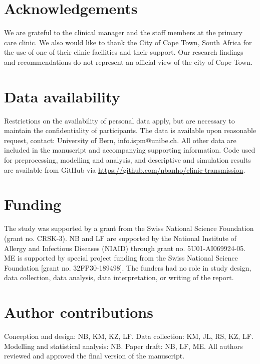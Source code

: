 \documentclass[fleqn,11pt]{wlscirep}
\begin{document}
\newpage


\section*{Acknowledgements}
We are grateful to the clinical manager and the staff members at the primary care clinic. We also would like to thank the City of Cape Town, South Africa for the use of one of their clinic facilities and their support. Our research findings and recommendations do not represent an official view of the city of Cape Town. 

\section*{Data availability}
Restrictions on the availability of personal data apply, but are necessary to maintain the confidentiality of participants. The data is available upon reasonable request, contact: University of Bern, info.ispm@unibe.ch. All other data are included in the manuscript and accompanying supporting information. Code used for preprocessing, modelling and analysis, and descriptive and simulation results are available from GitHub via \url{https://github.com/nbanho/clinic-transmission}.

\section*{Funding}
The study was supported by a grant from the Swiss National Science Foundation (grant no. CRSK-3).  NB and LF are supported by the National Institute of Allergy and Infectious Diseases (NIAID) through grant no. 5U01-AI069924-05. ME is supported by special project funding from the Swiss National Science Foundation [grant no. 32FP30-189498]. The funders had no role in study design, data collection, data analysis, data interpretation, or writing of the report.

\section*{Author contributions}
Conception and design: NB, KM, KZ, LF. Data collection: KM, JL, RS, KZ, LF. Modelling and statistical analysis: NB. Paper draft: NB, LF, ME. All authors reviewed and approved the final version of the manuscript.

\newpage


\end{document}
